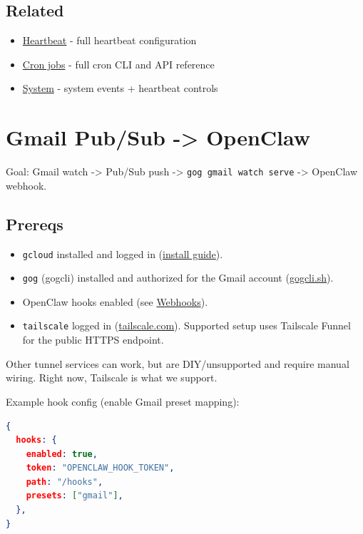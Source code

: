 \subsection{Related}


\begin{itemize}
  \item \href{/gateway/heartbeat}{Heartbeat} - full heartbeat configuration
  \item \href{/automation/cron-jobs}{Cron jobs} - full cron CLI and API reference
  \item \href{/cli/system}{System} - system events + heartbeat controls
\end{itemize}



\clearpage

\section{Gmail Pub/Sub -> OpenClaw}


Goal: Gmail watch -> Pub/Sub push -> \texttt{gog gmail watch serve} -> OpenClaw webhook.

\subsection{Prereqs}


\begin{itemize}
  \item \texttt{gcloud} installed and logged in (\href{https://docs.cloud.google.com/sdk/docs/install-sdk}{install guide}).
  \item \texttt{gog} (gogcli) installed and authorized for the Gmail account (\href{https://gogcli.sh/}{gogcli.sh}).
  \item OpenClaw hooks enabled (see \href{/automation/webhook}{Webhooks}).
  \item \texttt{tailscale} logged in (\href{https://tailscale.com/}{tailscale.com}). Supported setup uses Tailscale Funnel for the public HTTPS endpoint.
\end{itemize}

Other tunnel services can work, but are DIY/unsupported and require manual wiring.
Right now, Tailscale is what we support.

Example hook config (enable Gmail preset mapping):

\begin{lstlisting}[language=json]
{
  hooks: {
    enabled: true,
    token: "OPENCLAW_HOOK_TOKEN",
    path: "/hooks",
    presets: ["gmail"],
  },
}
\end{lstlisting}


